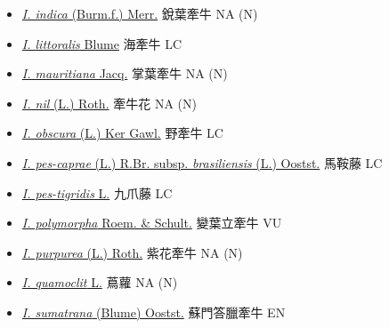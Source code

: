 \begin{itemize}
\begin{itemize}
        \item[] \href{http://www.theplantlist.org/tpl1.1/search?q=Ipomoea+indica}{\textit{I. indica} (Burm.f.) Merr.}   銳葉牽牛   NA (N)
        \item[] \href{http://www.theplantlist.org/tpl1.1/search?q=Ipomoea+littoralis}{\textit{I. littoralis} Blume}   海牽牛   LC
        \item[] \href{http://www.theplantlist.org/tpl1.1/search?q=Ipomoea+mauritiana}{\textit{I. mauritiana} Jacq.}   掌葉牽牛   NA (N)
        \item[] \href{http://www.theplantlist.org/tpl1.1/search?q=Ipomoea+nil}{\textit{I. nil} (L.) Roth.}   牽牛花   NA (N)
        \item[] \href{http://www.theplantlist.org/tpl1.1/search?q=Ipomoea+obscura}{\textit{I. obscura} (L.) Ker Gawl.}   野牽牛   LC
        \item[] \href{http://www.theplantlist.org/tpl1.1/search?q=Ipomoea+pes-caprae+subsp.+brasiliensis}{\textit{I. pes-caprae} (L.) R.Br. subsp. \textit{brasiliensis} (L.) Oostst.}   馬鞍藤   LC
        \item[] \href{http://www.theplantlist.org/tpl1.1/search?q=Ipomoea+pes-tigridis}{\textit{I. pes-tigridis} L.}   九爪藤   LC
        \item[] \href{http://www.theplantlist.org/tpl1.1/search?q=Ipomoea+polymorpha}{\textit{I. polymorpha} Roem. \& Schult.}   變葉立牽牛   VU
        \item[] \href{http://www.theplantlist.org/tpl1.1/search?q=Ipomoea+purpurea}{\textit{I. purpurea} (L.) Roth.}   紫花牽牛   NA (N)
        \item[] \href{http://www.theplantlist.org/tpl1.1/search?q=Ipomoea+quamoclit}{\textit{I. quamoclit} L.}   蔦蘿   NA (N)
        \item[] \href{http://www.theplantlist.org/tpl1.1/search?q=Ipomoea+sumatrana}{\textit{I. sumatrana} (Blume) Oostst.}   蘇門答臘牽牛   EN

\end{itemize}
\end{itemize}
